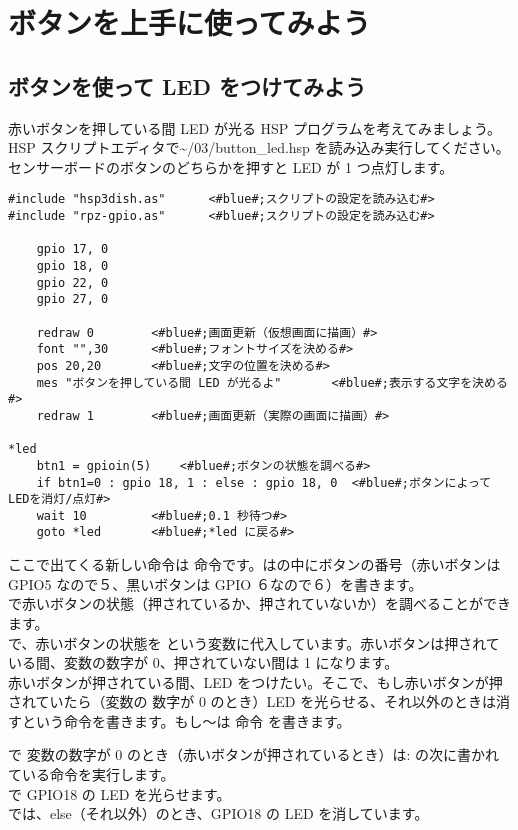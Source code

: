 \section{ボタンを上手に使ってみよう}
\subsection{ボタンを使って LED をつけてみよう}
赤いボタンを押している間 LED が光る HSP プログラムを考えてみましょう。HSP スクリプトエディタで\textasciitilde /03/button\_led.hsp を読み込み実行してください。センサーボードのボタンのどちらかを押すと LED が 1 つ点灯します。\\

\begin{lstlisting}[caption=button\_led.hsp,label=button_led.hsp]
#include "hsp3dish.as"		<#blue#;スクリプトの設定を読み込む#>
#include "rpz-gpio.as"		<#blue#;スクリプトの設定を読み込む#>

	gpio 17, 0
	gpio 18, 0
	gpio 22, 0
	gpio 27, 0
   
	redraw 0		<#blue#;画面更新（仮想画面に描画）#>
	font "",30		<#blue#;フォントサイズを決める#>
	pos 20,20		<#blue#;文字の位置を決める#>
	mes "ボタンを押している間 LED が光るよ"		<#blue#;表示する文字を決める#>
	redraw 1		<#blue#;画面更新（実際の画面に描画）#>

*led
	btn1 = gpioin(5) 	<#blue#;ボタンの状態を調べる#>
	if btn1=0 : gpio 18, 1 : else : gpio 18, 0 	<#blue#;ボタンによってLEDを消灯/点灯#>
	wait 10 		<#blue#;0.1 秒待つ#>
	goto *led 		<#blue#;*led に戻る#>
\end{lstlisting}

ここで出てくる新しい命令は  命令です。は\code{()}の中にボタンの番号（赤いボタンは
GPIO5 なので５、黒いボタンは GPIO ６なので６）を書きます。\\

で赤いボタンの状態（押されているか、押されていないか）を調べることができます。\\
で、赤いボタンの状態を  という変数に代入しています。赤いボタンは押されている間、変数の数字が 0、押されていない間は 1 になります。\\

赤いボタンが押されている間、LED をつけたい。そこで、もし赤いボタンが押されていたら（変数の
数字が 0 のとき）LED を光らせる、それ以外のときは消すという命令を書きます。もし～は  命令
を書きます。

 で  変数の数字が 0 のとき（赤いボタンが押されているとき）は\code{ }: の次に書かれている命令を実行します。\\
 で GPIO18 の LED を光らせます。\\
 では、else（それ以外）のとき、GPIO18 の LED を消しています。\\

